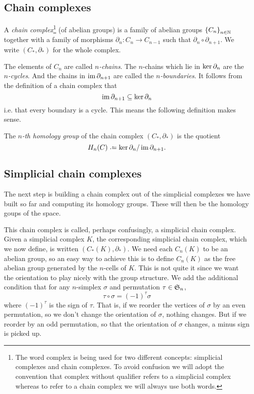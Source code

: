 \documentclass[../main.tex]{subfiles}
\begin{document}
\subsection{Chain complexes}
\begin{definition}
	A \emph{chain complex}\footnote{The word complex is being used for two different
		concepts: simplicial complexes and chain complexes. To avoid confusion we will adopt
		the convention that complex without qualifier refers to a simplicial complex whereas
	to refer to a chain complex we will always use both words.} (of abelian groups) is a
	family of abelian groups \( \set{C_n}_{n \in \N} \) together with a family of
	morphisms \( \partial_n \colon C_n \to C_{n-1} \) such that \( \partial_n \circ
	\partial_{n+1} \). We write \( (C_\ast, \partial_\ast) \) for the whole complex. 
\end{definition}
The elements of \( C_n \) are called \emph{\( n \)-chains}. The \( n \)-chains which lie
in \( \cyc{n} \) are the \emph{\( n \)-cycles}. And the chains in
\emph{\( \bound{n+1} \)} are called the \emph{\( n \)-boundaries}. It
follows from the definition of a chain complex that
\begin{equation*}
	\bound{n+1} \subseteq \cyc{n}
\end{equation*}
i.e. that every boundary is a cycle. This means the following definition makes sense.
\begin{definition}
	The \emph{\( n \)-th homology group} of the chain complex \( (C_\ast, \partial_\ast) \)
	is the quotient
	\begin{equation*}
		H_n(C) \defeq \cyc{n} / \bound{n+1}.
	\end{equation*}
\end{definition}

\subsection{Simplicial chain complexes}
The next step is building a chain complex out of the simplicial complexes we have built so
far and computing its homology groups. These will then be the homology goups of the
space. 

This chain complex is called, perhaps confusingly, a simplicial chain complex. Given a
simplicial complex \( K \), the corresponding simplicial chain complex, which we now
define, is written \( (C_\ast(K), \partial_\ast) \). We need each \( C_n(K) \) to be an
abelian group, so an easy way to achieve this is to define \( C_n(K) \) as the free
abelian group generated by the \( n \)-cells of \( K \). This is not quite it since we
want the orientation to play nicely with the group structure. We add the additional
condition that for any \( n \)-simplex \( \sigma \) and permutation \( \tau \in \S_n \),
\begin{equation*}
	\tau \circ \sigma = (-1)^\tau \sigma
\end{equation*}
where \( (-1)^\tau \) is the sign of \( \tau \). That is, if we reorder the vertices of \(
\sigma \) by an even permutation, so we don't change the orientation of \( \sigma \),
nothing changes. But if we reorder by an odd permutation, so that the orientation of \(
\sigma \) changes, a minus sign is picked up. 
\end{document}
